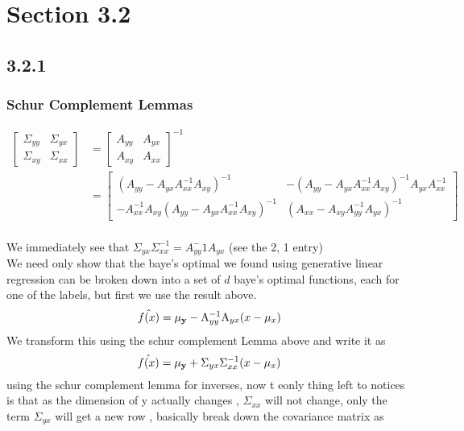 \section{Section 3.2}
\subsection{3.2.1}

\subsubsection{Schur Complement Lemmas}
 $$
\begin{aligned}
{\left[\begin{array}{cc}
\Sigma_{yy} & \Sigma_{yx} \\
\Sigma_{xy} & \Sigma_{xx}
\end{array}\right] } &=\left[\begin{array}{ll}
A_{yy} & A_{yx} \\
A_{xy} & A_{xx}
\end{array}\right]^{-1} \\
&=\left[\begin{array}{cc}
\left(A_{yy}-A_{yx} A_{xx}^{-1} A_{xy}\right)^{-1} & -\left(A_{yy}-A_{yx} A_{xx}^{-1} A_{xy}\right)^{-1} A_{yx} A_{xx}^{-1} \\
-A_{xx}^{-1} A_{xy}\left(A_{yy}-A_{yx} A_{xx}^{-1} A_{xy}\right)^{-1} & \left(A_{xx}-A_{xy} A_{yy}^{-1} A_{yx}\right)^{-1}
\end{array}\right]
\end{aligned}
$$
\\
We immediately see that $\Sigma_{yx}\Sigma_{xx}^{-1} = A_{yy}^-{1} A_{yx}$ (see the 2, 1 entry) 
\\
We need only show that the baye's optimal we found using generative linear regression can be broken down into  a set of $d$ baye's optimal functions,
 each for one of the labels, but first we use the result above.
\begin{equation}
    \hat{f(x)}  = \vb{\mu_y} - \mathrm{A}_{yy}^{-1}\mathrm{A}_{yx}(x - \mu_x)
\end{equation}
We transform this using the schur complement Lemma above and write it as 
\begin{equation}
    \hat{f(x)}  = \vb{\mu_y} + {\Sigma}_{yx}{\Sigma}_{xx}^{-1}(x - \mu_x)
\end{equation}
using the schur complement lemma for inverses, now t eonly thing left to notices is that as the dimension of y actually changes , $\Sigma_{xx}$ will not change, only the term $\Sigma_{yx}$ will get a new row , basically break down the covariance matrix as 
